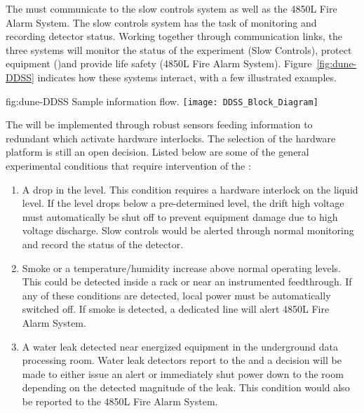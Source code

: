  
The  must communicate to the  slow controls
system as well as the 4850L Fire Alarm System.  The  slow
controls system has the task of monitoring and recording detector
status.  Working together through communication links, the three
systems will monitor the status of the experiment (Slow Controls),
protect equipment ()and provide life safety (4850L Fire
Alarm System). Figure~\ref{fig:dune-DDSS} indicates how these systems
interact, with a few illustrated examples.
\begin{dunefigure}{fig:dune-DDSS}
  {Sample  information flow.}
  \texttt{[image: DDSS\_Block\_Diagram]}
\end{dunefigure}


The  will be implemented through robust sensors feeding
information to redundant  which activate hardware
interlocks. The selection of the  hardware platform is
still an open decision.  Listed below are some of the general
 experimental conditions that require intervention of the
:
\begin{enumerate}
 \item A drop in the  level.  This condition requires a hardware
   interlock on the liquid level.  If the level drops below a
   pre-determined level, the drift high voltage must automatically be 
   shut off to prevent equipment damage due to high voltage discharge.  Slow controls would be
   alerted through normal monitoring and record the status of the detector.
 \item Smoke or a temperature/humidity increase above normal operating
   levels. This could be detected inside a rack or near an instrumented
   feedthrough.  If any of these conditions are detected, local
   power must be automatically switched off. If smoke is detected, a
   dedicated line will alert 4850L Fire Alarm System.
 \item A water leak detected near energized equipment in the 
   underground data processing room.  Water leak detectors 
   report to the   and a decision will be made to either
   issue an alert or immediately shut power down to the room depending
   on the detected magnitude of the leak.  This condition would also be reported
   to the 4850L Fire Alarm System.
\end{enumerate}




